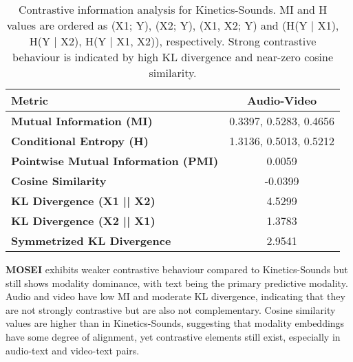 \begin{table}[h!]
    \centering
    \caption{Contrastive information analysis for Kinetics-Sounds. MI and H values are ordered as (X1; Y), (X2; Y), (X1, X2; Y) and (H(Y | X1), H(Y | X2), H(Y | X1, X2)), respectively. Strong contrastive behaviour is indicated by high KL divergence and near-zero cosine similarity.}
    \label{tab:ks_contrastive}
    \begin{tabular}{l|c}
    \hline
    \textbf{Metric} & \textbf{Audio-Video} \\ \hline
    \textbf{Mutual Information (MI)} & 0.3397, 0.5283, 0.4656 \\
    \textbf{Conditional Entropy (H)} & 1.3136, 0.5013, 0.5212 \\
    \textbf{Pointwise Mutual Information (PMI)} & 0.0059 \\
    \textbf{Cosine Similarity} & -0.0399 \\
    \textbf{KL Divergence (X1 || X2)} & 4.5299 \\
    \textbf{KL Divergence (X2 || X1)} & 1.3783 \\
    \textbf{Symmetrized KL Divergence} & 2.9541 \\ \hline
    \end{tabular}%
\end{table}

\textbf{MOSEI} exhibits weaker contrastive behaviour compared to Kinetics-Sounds but still shows modality dominance, with text being the primary predictive modality. Audio and video have low MI and moderate KL divergence, indicating that they are not strongly contrastive but are also not complementary. Cosine similarity values are higher than in Kinetics-Sounds, suggesting that modality embeddings have some degree of alignment, yet contrastive elements still exist, especially in audio-text and video-text pairs.

